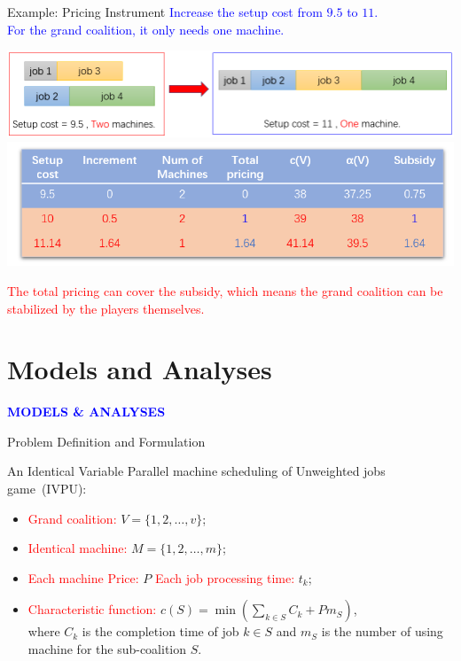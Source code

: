 \documentclass[14pt]{beamer}
\begin{document}
\begin{frame}{Example: Pricing Instrument}
\small
\centering
\textcolor{blue}{Increase the setup cost from $9.5$ to $11$.\\
For the grand coalition, it only needs one machine.}
\vspace{2mm}

\centering
\includegraphics[width = 1\textwidth]{Figures/m0.png}
\pause
\centering
\includegraphics[width = 1\textwidth]{Figures/m4.png}

\textcolor{red}{The total pricing can cover the subsidy, which means the grand coalition can be stabilized by the players themselves.}

\end{frame}

\section{Models and Analyses}
\begin{frame}
\centering
\large
\textcolor{blue}{\bf {\huge M}ODELS \&  {\huge A}NALYSES}
\end{frame}


\begin{frame}{Problem Definition and Formulation}
	\begin{definition}\label{definition:IVPU}
	\small
	\justifying
	An Identical Variable Parallel machine scheduling of Unweighted jobs game~(IVPU):\\
	\begin{itemize}
	\pause
	\item \textcolor{red}{Grand coalition:} $V = \{1,2,\ldots,v\}$;
	\pause
	\item \textcolor{red}{Identical machine:} $M = \{1,2,\ldots,m\}$;
	\pause
	\item \textcolor{red}{Each machine Price:} $P$  \textcolor{red}{Each job processing time:} $t_k$;
	\pause
	\item \textcolor{red}{Characteristic function:} $c(S) = \min(\sum_{k\in S}C_k + Pm_S)$,\\
	\vspace{3mm}
	where $C_k$ is the completion time of job $k \in S$ and $m_S$ is the number of using machine for the sub-coalition $S$.
	\end{itemize}
	\end{definition}
\end{frame}
\end{document}
